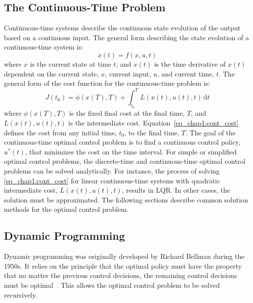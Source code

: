 \subsection{The Continuous-Time Problem}
%
Continuous-time systems describe the continuous state evolution of the output based on a continuous input.
The general form describing the state evolution of a continuous-time system is:
%
\begin{equation}
\dot{x}(t) = f(x,u,t)
\label{eq_chap1:cont_EOM}
\end{equation}
%
where $x$ is the current state at time $t$, and $\dot{x}(t)$ is the time derivative of $x(t)$ dependent on the current state, $x$, current input, $u$, and current time, $t$. The general form of the cost function for the continuous-time problem is:
%
\begin{equation}
J(t_0)=\phi(x(T),T) + \int_{t_0}^TL(x(t),u(t),t) \, \text{d}t
\label{eq_chap1:cont_cost}
\end{equation}
%
where $\phi(x(T),T)$ is the fixed final cost at the final time, $T$, and $L(x(t),u(t),t)$ is the intermediate cost. Equation~\eqref{eq_chap1:cont_cost} defines the cost from any initial time, $t_0$, to the final time, $T$. The goal of the continuous-time optimal control problem is to find a continuous control policy, $u^*(t)$, that minimizes the cost on the time interval.
For simple or simplified optimal control problems, the discrete-time and continuous-time optimal control problems can be solved analytically. For instance, the process of solving \eqref{eq_chap1:cont_cost} for linear continuous-time systems with quadratic intermediate cost, $L(x(t),u(t),t)$, results in LQR. In other cases, the solution must be approximated. The following sections describe common solution methods for the optimal control problem.


\subsection{Dynamic Programming}
Dynamic programming was originally developed by Richard Bellman during the 1950s.
It relies on the principle that the optimal policy must have the property that no matter the previous control decisions, the remaining control decisions must be optimal~\cite{Bellman:1957a}.
This allows the optimal control problem to be solved recursively.

